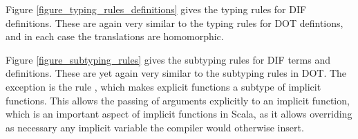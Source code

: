Figure \ref{figure_typing_rules_definitions} gives the typing rules for DIF
definitions. These are again very similar to the typing rules for DOT
defintions, and in each case the translations are homomorphic.

\begin{figure*}[h]
    
    \caption{Typing and translation rules for DIF definitions}
    \label{figure_typing_rules_definitions}
\end{figure*}

Figure \ref{figure_subtyping_rules} gives the subtyping rules for DIF terms and
definitions. These are yet again very similar to the subtyping rules in DOT.
The exception is the rule , which makes explicit functions
a subtype of implicit functions. This allows the passing of arguments
explicitly to an implicit function, which is an important aspect of implicit
functions in Scala, as it allows overriding as necessary any implicit variable
the compiler would otherwise insert.

\begin{figure*}[h]
    
    \caption{Subtyping rules for DIF}
    \label{figure_subtyping_rules}
\end{figure*}
